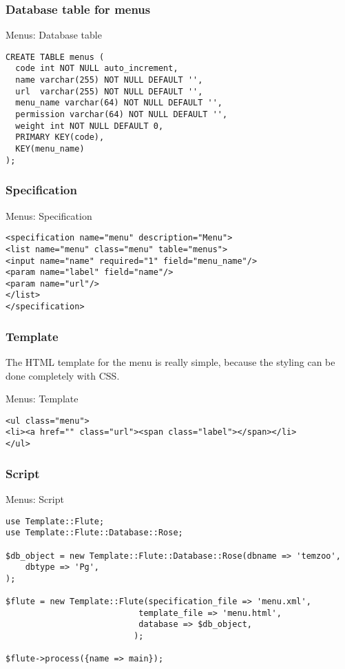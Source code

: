 \subsubsection{Database table for menus}
\begin{frame}[fragile]{Menus: Database table}
\begin{lstlisting}
CREATE TABLE menus (
  code int NOT NULL auto_increment,
  name varchar(255) NOT NULL DEFAULT '',
  url  varchar(255) NOT NULL DEFAULT '',
  menu_name varchar(64) NOT NULL DEFAULT '',
  permission varchar(64) NOT NULL DEFAULT '',
  weight int NOT NULL DEFAULT 0,
  PRIMARY KEY(code),
  KEY(menu_name)
);
\end{lstlisting}
\end{frame}

\subsubsection{Specification}
\begin{frame}[fragile]{Menus: Specification}
\begin{lstlisting}
<specification name="menu" description="Menu">
<list name="menu" class="menu" table="menus">
<input name="name" required="1" field="menu_name"/>
<param name="label" field="name"/>
<param name="url"/>
</list>
</specification>
\end{lstlisting}
\end{frame}

\subsubsection{Template}
The HTML template for the menu is really simple, because the
styling can be done completely with CSS.

\begin{frame}[fragile]{Menus: Template}
\begin{lstlisting}
<ul class="menu">
<li><a href="" class="url"><span class="label"></span></li>
</ul>
\end{lstlisting}
\end{frame}

\subsubsection{Script}
\begin{frame}[fragile]{Menus: Script}
\begin{lstlisting}
use Template::Flute;
use Template::Flute::Database::Rose;

$db_object = new Template::Flute::Database::Rose(dbname => 'temzoo',
    dbtype => 'Pg',
);

$flute = new Template::Flute(specification_file => 'menu.xml',
						   template_file => 'menu.html',
						   database => $db_object,
						  );

$flute->process({name => main});
\end{lstlisting}
\end{frame}

